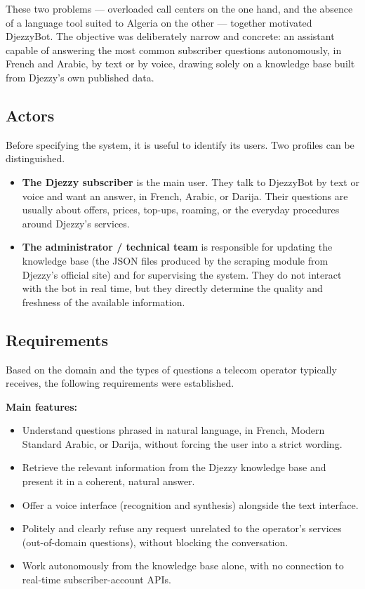 \documentclass[12pt, a4paper]{report}
\newcommand{\humantext}[1]{#1}      %
\begin{document}
\humantext{These two problems --- overloaded call centers on the one hand, and the absence of a language tool suited to Algeria on the other --- together motivated DjezzyBot. The objective was deliberately narrow and concrete: an assistant capable of answering the most common subscriber questions autonomously, in French and Arabic, by text or by voice, drawing solely on a knowledge base built from Djezzy's own published data.}

\subsection{Actors}

\humantext{Before specifying the system, it is useful to identify its users. Two profiles can be distinguished.}

\begin{itemize}
    \item \humantext{\textbf{The Djezzy subscriber} is the main user. They talk to DjezzyBot by text or voice and want an answer, in French, Arabic, or Darija. Their questions are usually about offers, prices, top-ups, roaming, or the everyday procedures around Djezzy's services.}
    \item \humantext{\textbf{The administrator / technical team} is responsible for updating the knowledge base (the JSON files produced by the scraping module from Djezzy's official site) and for supervising the system. They do not interact with the bot in real time, but they directly determine the quality and freshness of the available information.}
\end{itemize}

\subsection{Requirements}

\humantext{Based on the domain and the types of questions a telecom operator typically receives, the following requirements were established.}

\textbf{Main features:}
\begin{itemize}
    \item \humantext{Understand questions phrased in natural language, in French, Modern Standard Arabic, or Darija, without forcing the user into a strict wording.}
    \item \humantext{Retrieve the relevant information from the Djezzy knowledge base and present it in a coherent, natural answer.}
    \item \humantext{Offer a voice interface (recognition and synthesis) alongside the text interface.}
    \item \humantext{Politely and clearly refuse any request unrelated to the operator's services (out-of-domain questions), without blocking the conversation.}
    \item \humantext{Work autonomously from the knowledge base alone, with no connection to real-time subscriber-account APIs.}
\end{itemize}
\end{document}
